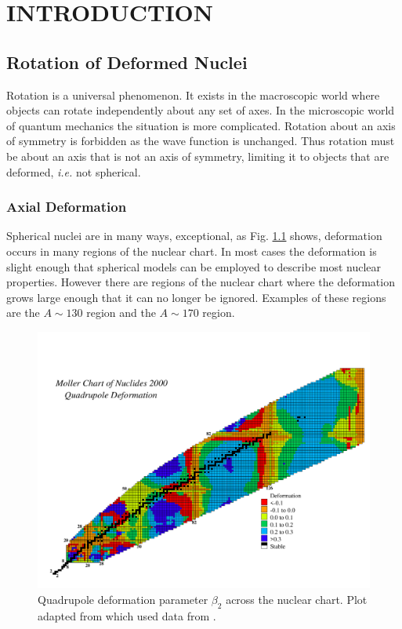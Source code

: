 %
%

\chapter{INTRODUCTION}
\label{chp:intro}
\section{Rotation of Deformed Nuclei}
\label{sec:intro-rot-def-nuc}
Rotation is a universal phenomenon. It exists in the macroscopic world where objects can rotate independently about any set of axes. In the microscopic world of quantum mechanics the situation is more complicated. Rotation about an axis of symmetry is forbidden as the wave function is unchanged. Thus rotation must be about an axis that is not an axis of symmetry, limiting it to objects that are deformed, \emph{i.e.} not spherical.

\subsection{Axial Deformation}
\label{ssec:intro-rot-axial-def}
Spherical nuclei are in many ways, exceptional, as Fig. \ref{fig:chp1-quad-def} shows, deformation occurs in many regions of the nuclear chart. In most cases the deformation is slight enough that spherical models can be employed to describe most nuclear properties. However there are regions of the nuclear chart where the deformation grows large enough that it can no longer be ignored. Examples of these regions are the $A\sim{}130$ region and the $A\sim{}170$ region.

\begin{figure}[t!]
\centerline{\includegraphics[width=\textwidth,clip=true,trim=0 0 0 75]{./img/c1/chart_thb2.pdf}}
	\caption{Quadrupole deformation parameter $\beta_2$ across the nuclear chart. Plot adapted from \cite{nilssonDiagrams} which used data from \cite{mollerGroundStateDef}.\label{fig:chp1-quad-def}}
\end{figure}

